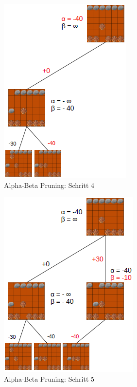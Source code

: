\begin{figure}[h]
	\centering
	\includegraphics{img/ab4}
	\caption{Alpha-Beta Pruning: Schritt 4}
	\label{fig:ab4}
\end{figure}

\begin{figure}[h]
	\centering
	\includegraphics{img/ab5}
	\caption{Alpha-Beta Pruning: Schritt 5}
	\label{fig:ab5}
\end{figure}

